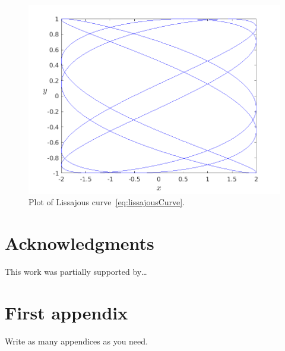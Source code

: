 \documentclass[10pt,twoside]{article}
\theoremstyle{remark}
\theoremstyle{definition}
\begin{document}
\begin{figure}[!h]
\centering
\includegraphics[scale=0.75]{lissajousCurve}
\caption{Plot of Lissajous curve~\eqref{eq:lissajousCurve}.} 
\label{fig:lissajousCurve}
\end{figure}

\section*{Acknowledgments}
\noindent This work was partially supported by\ldots




\appendix
\section{First appendix}
\noindent Write as many appendices as you need.
\end{document}
